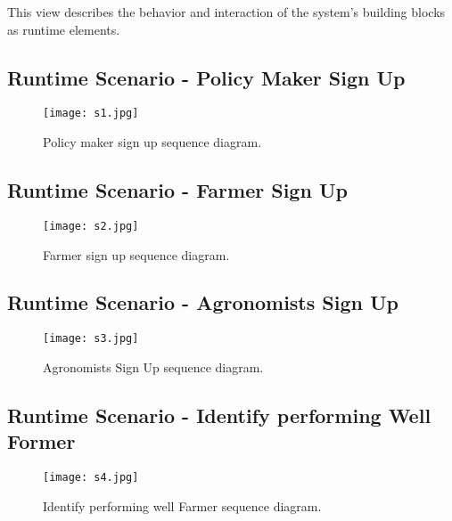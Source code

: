 \documentclass[../../main.tex]{subfiles}
\begin{document}
This view describes the behavior and interaction of the system’s building blocks as runtime elements.


\subsection{Runtime Scenario  - Policy Maker Sign Up}

\begin{figure}[H]
    \centering
    \texttt{[image: s1.jpg]}
    \caption{
        Policy maker sign up sequence diagram.
    }
\end{figure}

\subsection{Runtime Scenario  - Farmer Sign Up}

\begin{figure}[H]
    \centering
    \texttt{[image: s2.jpg]}
    \caption{
        Farmer sign up sequence diagram.
    }
\end{figure}


\subsection{Runtime Scenario  - Agronomists Sign Up}

\begin{figure}[H]
    \centering
    \texttt{[image: s3.jpg]}
    \caption{
        Agronomists Sign Up sequence diagram.
    }
\end{figure}


\subsection{Runtime Scenario  - Identify performing Well Former}

\begin{figure}[H]
    \centering
    \texttt{[image: s4.jpg]}
    \caption{
        Identify performing well Farmer sequence diagram.
    }
\end{figure}
\end{document}
